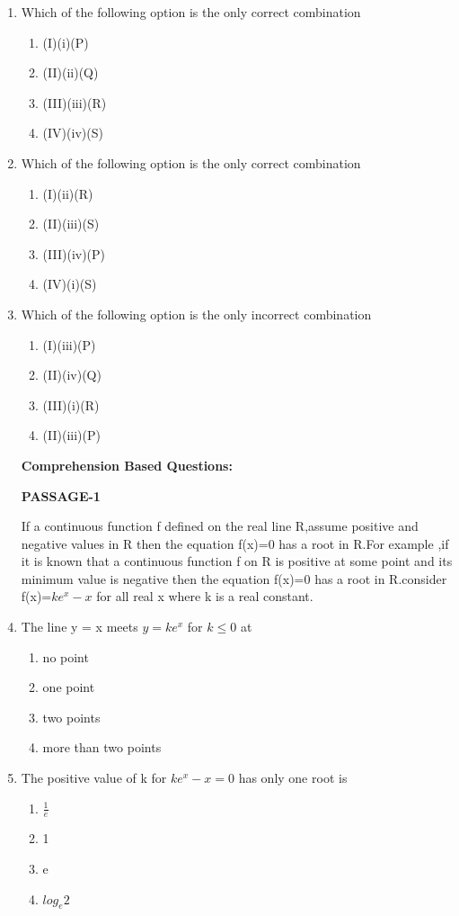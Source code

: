 \begin{enumerate}[label=\arabic*.,ref=\thesubsection.\theenumi]
\item Which of the following option is the only correct combination
\begin{enumerate}
    \item (I)(i)(P)                \item (II)(ii)(Q)
    \item (III)(iii)(R)            \item (IV)(iv)(S)
\end{enumerate}
\item Which of the following option is the only correct combination
\begin{enumerate}
    \item (I)(ii)(R)
    \item (II)(iii)(S)
    \item (III)(iv)(P)
    \item (IV)(i)(S)
\end{enumerate}
\item Which of the following option is the only incorrect combination
\begin{enumerate}
    \item (I)(iii)(P)
    \item (II)(iv)(Q)
    \item (III)(i)(R)
    \item (II)(iii)(P)
\end{enumerate}

\clearpage
\twocolumn

\textbf{Comprehension Based Questions:}

\textbf{PASSAGE-1}

If a continuous function f defined on the real line R,assume positive and negative values in R then the equation f(x)=0 has a root in R.For example ,if it is known that a continuous function f on R is positive at some point and its minimum value is negative then the equation f(x)=0 has a root in R.consider f(x)=$ke^x-x$ for all real x where k is a real constant.

\item The line y = x meets $y = ke^x$ for $k \leq 0$ at
\begin{enumerate}
\item no point
\item one point
\item two points
\item more than two points
\end{enumerate}

\item The positive value of k for $ke^x - x = 0$ has only one root is
\begin{enumerate}
\item $\frac{1}{e}$
\item 1
\item e
\item $log_e2$
\end{enumerate}


\end{enumerate}

